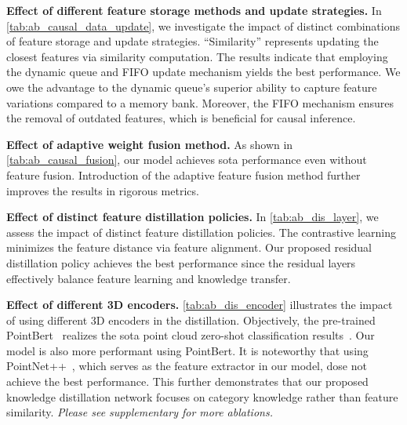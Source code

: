 \noindent
{\bf Effect of different feature storage methods and update strategies.} In \cref{tab:ab_causal_data_update}, we investigate the impact of distinct combinations of feature storage and update strategies. “Similarity” represents updating the closest features via similarity computation. 
The results indicate that employing the dynamic queue and FIFO update mechanism yields the best performance. 
We owe the advantage to the dynamic queue's superior ability to capture feature variations compared to a memory bank. Moreover, the FIFO mechanism ensures the removal of outdated features, which is beneficial for causal inference.


\noindent
{\bf Effect of adaptive weight fusion method.} As shown in \cref{tab:ab_causal_fusion}, our model achieves sota performance even without feature fusion. Introduction of the adaptive feature fusion method further improves the results in rigorous metrics.

\noindent
{\bf Effect of distinct feature distillation policies.} In \cref{tab:ab_dis_layer}, we assess the impact of distinct feature distillation policies. The contrastive learning minimizes the feature distance via feature alignment. Our proposed residual distillation policy achieves the best performance since the residual layers effectively balance feature learning and knowledge transfer.

\noindent
{\bf Effect of different 3D encoders.} \cref{tab:ab_dis_encoder} illustrates the impact of using different 3D encoders in the distillation. Objectively, the pre-trained PointBert~\cite{yu2022point} realizes the sota point cloud zero-shot classification results~\cite{xue2024ulip}. Our model is also more performant using PointBert. It is noteworthy that using PointNet++~\cite{qi2017pointnet++}, which serves as the feature extractor in our model, dose not achieve the best performance. This further demonstrates that our proposed knowledge distillation network focuses on category knowledge rather than feature similarity.
\emph{Please see supplementary for more ablations.}